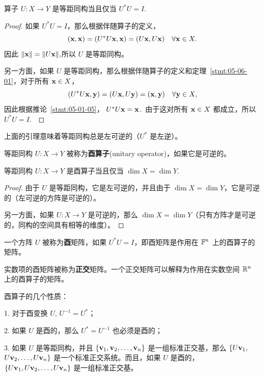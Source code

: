 \begin{lemma}\label{stmt:05-06-02} 算子 $U: X \to Y$ 是等距同构当且仅当 $U^*U = I$.~\end{lemma}

\begin{proof}如果 $U^*U = I$，那么根据伴随算子的定义，
$$(\mathbf{x}, \mathbf{x}) = (U^*U\mathbf{x}, \mathbf{x}) = (U\mathbf{x}, U\mathbf{x}) \quad \forall \mathbf{x} \in X.$$
因此 $\|\mathbf{x}\| = \|U\mathbf{x}\|,$所以 $U$ 是等距同构。

另一方面，如果 $U$ 是等距同构，那么根据伴随算子的定义和定理~\ref{stmt:05-06-01}，对于所有 $\mathbf{x} \in X$，
$$(U^*U\mathbf{x}, \mathbf{y}) = (U\mathbf{x}, U\mathbf{y}) = (\mathbf{x}, \mathbf{y}) \quad \forall \mathbf{y} \in X,$$
因此根据推论~\ref{stmt:05-01-05}， $U^*U\mathbf{x} = \mathbf{x}$.~由于这对所有 $\mathbf{x} \in X$ 都成立，所以 $U^*U = I$.~\end{proof}

上面的引理意味着等距同构总是左可逆的（$U^*$ 是左逆）。

\begin{definition*}
等距同构 $U: X \to Y$ 被称为\textbf{酉算子}(unitary operator)，如果它是可逆的。
\end{definition*}

\begin{proposition}\label{stmt:05-06-03}
等距同构 $U: X \to Y$ 是酉算子当且仅当 $\dim X = \dim Y$.~
\end{proposition}

\begin{proof}由于 $U$ 是等距同构，它是左可逆的，并且由于 $\dim X = \dim Y$，它是可逆的（左可逆的方阵是可逆的）。

另一方面，如果 $U: X \to Y$ 是可逆的，那么 $\dim X = \dim Y$（只有方阵才是可逆的，同构的空间具有相等的维度）。\end{proof}

一个方阵 $U$ 被称为\textbf{酉}矩阵，如果 $U^*U = I$，即酉矩阵是作用在 $\mathbb{F}^n$ 上的酉算子的矩阵。

实数项的酉矩阵被称为\textbf{正交}矩阵。一个正交矩阵可以解释为作用在实数空间 $\mathbb{R}^n$ 上的酉算子的矩阵。

酉算子的几个性质：

1. 对于酉变换 $U$, $U^{-1} = U^*$；

2. 如果 $U$ 是酉的，那么 $U^* = U^{-1}$ 也必须是酉的；

3. 如果 $U$ 是等距同构，并且 $\{\mathbf{v}_1, \mathbf{v}_2, \dots, \mathbf{v}_n\}$ 是一组标准正交基，那么 $\{U\mathbf{v}_1,$ $ U\mathbf{v}_2, \dots, U\mathbf{v}_n\}$ 是一个标准正交系统。而且，如果 $U$ 是酉的，$\{U\mathbf{v}_1, U\mathbf{v}_2, \dots, U\mathbf{v}_n\}$ 是一组标准正交基。


